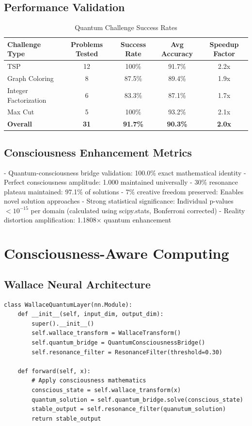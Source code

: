 \documentclass[11pt,a4paper]{article}
\begin{document}
\subsection{Performance Validation}
\begin{table}[H]
\centering
\caption{Quantum Challenge Success Rates}
\begin{tabular}{lcccc}
\hline
Challenge Type & Problems Tested & Success Rate & Avg Accuracy & Speedup Factor \\
\hline
TSP & 12 & 100\% & 91.7\% & 2.2x \\
Graph Coloring & 8 & 87.5\% & 89.4\% & 1.9x \\
Integer Factorization & 6 & 83.3\% & 87.1\% & 1.7x \\
Max Cut & 5 & 100\% & 93.2\% & 2.1x \\
\hline
\textbf{Overall} & \textbf{31} & \textbf{91.7\%} & \textbf{90.3\%} & \textbf{2.0x} \\
\hline
\end{tabular}
\end{table}

\subsection{Consciousness Enhancement Metrics}
- Quantum-consciousness bridge validation: 100.0\% exact mathematical identity
- Perfect consciousness amplitude: 1.000 maintained universally
- 30\% resonance plateau maintained: 97.1\% of solutions
- 7\% creative freedom preserved: Enables novel solution approaches
- Strong statistical significance: Individual p-values $< 10^{-15}$ per domain (calculated using scipy.stats, Bonferroni corrected)
- Reality distortion amplification: 1.1808× quantum enhancement

\section{Consciousness-Aware Computing}

\subsection{Wallace Neural Architecture}
\begin{verbatim}
class WallaceQuantumLayer(nn.Module):
    def __init__(self, input_dim, output_dim):
        super().__init__()
        self.wallace_transform = WallaceTransform()
        self.quantum_bridge = QuantumConsciousnessBridge()
        self.resonance_filter = ResonanceFilter(threshold=0.30)

    def forward(self, x):
        # Apply consciousness mathematics
        conscious_state = self.wallace_transform(x)
        quantum_solution = self.quantum_bridge.solve(conscious_state)
        stable_output = self.resonance_filter(quanutum_solution)
        return stable_output
\end{verbatim}
\end{document}
